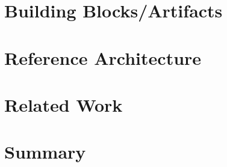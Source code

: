 \section{Building Blocks/Artifacts}

\section{Reference Architecture}

\section{Related Work}

\section{Summary} 
